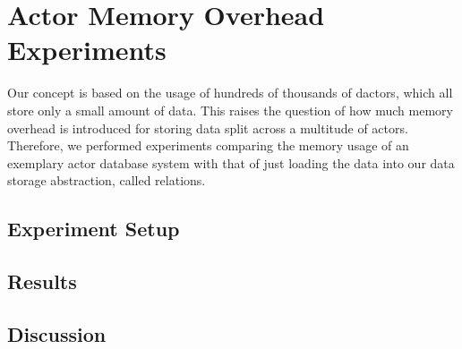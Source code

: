 
\section{Actor Memory Overhead Experiments}\label{sec:experiments}

  Our concept is based on the usage of hundreds of thousands of \glspl{dactor}, which all store only a small amount of data.
  This raises the question of how much memory overhead is introduced for storing data split across a multitude of actors.
  Therefore, we performed experiments comparing the memory usage of an exemplary actor database system with that of just loading the data into our data storage abstraction, called relations.

\subsection{Experiment Setup}

\subsection{Results}

\subsection{Discussion}
